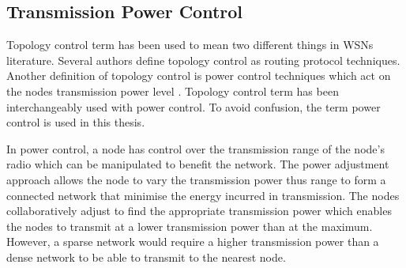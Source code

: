 
\subsection{Transmission Power Control} 
Topology control term has been used to mean two different things in WSNs literature. Several authors define topology control as routing protocol techniques. Another definition of topology control is power control techniques which act on the nodes transmission power level \cite{santitopologycontrol}. Topology control term has been interchangeably used with power control. To avoid confusion, the term power control is used in this thesis.

In power control, a node has control over the transmission range of the node's radio which can be manipulated to benefit the network. The power adjustment approach allows the node to vary the transmission power thus range to form a connected network that minimise the energy incurred in transmission. The nodes collaboratively adjust to find the appropriate transmission power which enables the nodes to transmit at a lower transmission power than at the maximum. However, a sparse network would require a higher transmission power than a dense network to be able to transmit to the nearest node. 

